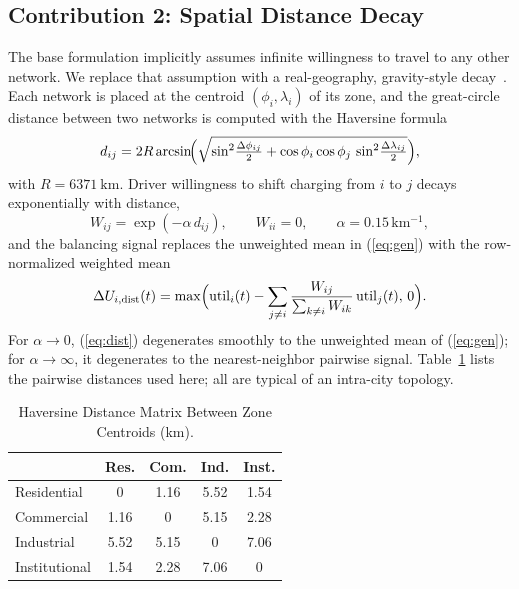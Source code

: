 \documentclass[10pt,journal]{IEEEtran}
\newcommand{\D}{\Delta}
\newcommand{\util}{\mathrm{util}}
\begin{document}
\subsection{Contribution 2: Spatial Distance Decay}\label{sec:decay}
The base formulation implicitly assumes infinite willingness to travel to
any other network. We replace that assumption with a real-geography,
gravity-style decay~\cite{huff1964}. Each network is placed at the centroid
$(\phi_i,\lambda_i)$ of its zone, and the great-circle distance between two
networks is computed with the Haversine formula
\begin{equation}\label{eq:hav}
  d_{ij}=2R\arcsin\!\Bigl(\sqrt{
    \sin^2\!\tfrac{\D\phi_{ij}}{2}
    +\cos\phi_i\cos\phi_j\,\sin^2\!\tfrac{\D\lambda_{ij}}{2}}\Bigr),
\end{equation}
with $R=6371~\mathrm{km}$. Driver willingness to shift charging from $i$ to
$j$ decays exponentially with distance,
\begin{equation}\label{eq:w}
  W_{ij}=\exp(-\alpha\,d_{ij}),\qquad W_{ii}=0,\qquad \alpha=0.15\,\mathrm{km^{-1}},
\end{equation}
and the balancing signal replaces the unweighted mean in
(\ref{eq:gen}) with the row-normalized weighted mean
\begin{equation}\label{eq:dist}
  \D U_{i,\mathrm{dist}}(t)=\max\Bigl(\util_i(t)-\sum_{j\ne i}
   \frac{W_{ij}}{\sum_{k\ne i}W_{ik}}\,\util_j(t),\,
   0\Bigr).
\end{equation}
For $\alpha\to0$, (\ref{eq:dist}) degenerates smoothly to the unweighted
mean of (\ref{eq:gen}); for $\alpha\to\infty$, it degenerates to the
nearest-neighbor pairwise signal. Table~\ref{tab:dist} lists the pairwise
distances used here; all are typical of an intra-city topology.

\begin{table}[!t]
\footnotesize
\setlength{\tabcolsep}{5pt}
\caption{Haversine Distance Matrix Between Zone Centroids (km).}
\label{tab:dist}
\centering
\begin{tabular}{lcccc}\toprule
 & Res. & Com. & Ind. & Inst. \\ \midrule
Residential    & 0    & 1.16 & 5.52 & 1.54 \\
Commercial     & 1.16 & 0    & 5.15 & 2.28 \\
Industrial     & 5.52 & 5.15 & 0    & 7.06 \\
Institutional  & 1.54 & 2.28 & 7.06 & 0    \\ \bottomrule
\end{tabular}
\end{table}
\end{document}
